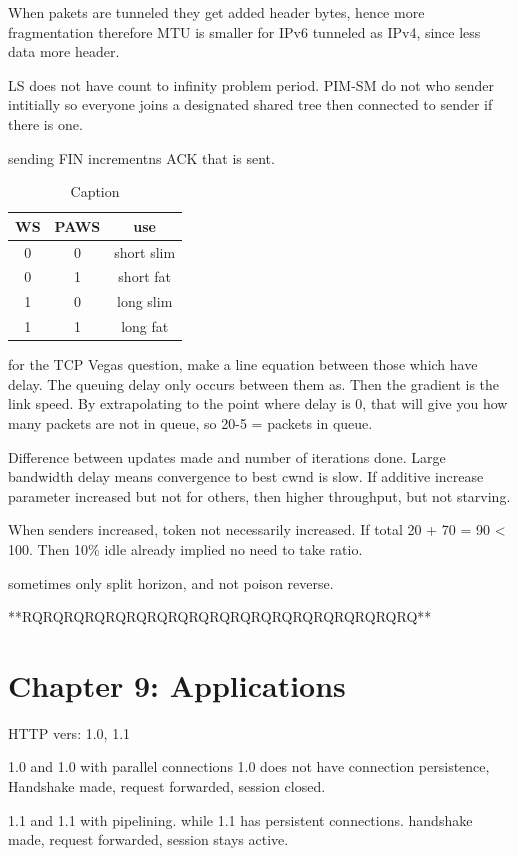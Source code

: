 \documentclass[11pt, a4paper]{article}
\begin{document}
When pakets are tunneled they get added header bytes, hence more fragmentation therefore MTU is smaller for IPv6 tunneled as IPv4, since less data more header.

LS does not have count to infinity problem period.
PIM-SM do not who sender intitially so everyone joins a designated shared tree then connected to sender if there is one.

sending FIN incrementns ACK that is sent.

\begin{table}[H]
    \centering
    \begin{tabular}{|c|c|c|}
    \hline
         WS & PAWS & use \\ \hline
         0 & 0 & short slim \\ \hline
         0 & 1 & short fat \\ \hline
         1 & 0 & long slim \\ \hline
         1 & 1 & long fat \\ \hline
    \end{tabular}
    \caption{Caption}
    \label{tab:my_label}
\end{table}

for the TCP Vegas question, make a line equation between those which have delay. The queuing delay only occurs between them as. Then the gradient is the link speed. By extrapolating to the point where delay is 0, that will give you how many packets are not in queue, so 20-5 = packets in queue.

Difference between updates made and number of iterations done.
Large bandwidth delay means convergence to best cwnd is slow.
If additive increase parameter increased but not for others, then higher throughput, but not starving.

When senders increased, token not necessarily increased.
If total 20 + 70 = 90 < 100. Then 10\% idle already implied no need to take ratio.

sometimes only split horizon, and not poison reverse.

**RQRQRQRQRQRQRQRQRQRQRQRQRQRQRQRQRQRQRQ**


\section{Chapter 9: Applications}

HTTP vers:
1.0, 1.1

1.0 and 1.0 with parallel connections
1.0 does not have connection persistence,
Handshake made, request forwarded, session closed.

1.1 and 1.1 with pipelining.
while 1.1 has persistent connections.
handshake made, request forwarded, session stays active.
\end{document}
